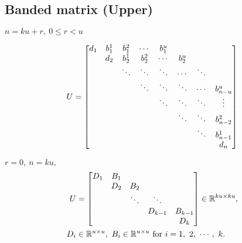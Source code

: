 \documentclass[11pt]{article}
\begin{document}






\newpage
\subsection{Banded matrix (Upper)}

$n = ku + r, \ 0\leq r<u$

\begin{align*}
    U &= \mqty[
        d_{1} & b^{1}_{1} & b^{2}_{1} & \cdots & b^{u}_{1} &   &   &   \\
          & d_{2} & b^{1}_{2} & b^{2}_{2} & \cdots & b^{u}_{2} &   &   \\
          &   & \ddots & \ddots & \ddots & \cdots & \ddots &   \\
          &   &   & \ddots & \ddots & \ddots & \cdots & b^{u}_{n-u} \\
          &   &   &   & \ddots & \ddots & \ddots & \vdots \\
          &   &   &   &   & \ddots & \ddots & b^{2}_{n-2} \\
          &   &   &   &   &   & \ddots & b^{1}_{n-1} \\
          &   &   &   &   &   &   & d_{n} \\
    ]\\
\end{align*}


$r = 0,\ n = ku, $
\begin{align*}
    U &= \mqty[
        D_{1} & B_{1} &   &   &  \\
          & D_{2} & B_{2} &   &  \\
          &   & \ddots & \ddots &  \\
          &   &   & D_{k-1} & B_{k-1}\\
          &   &   &   & D_{k}
    ] \in \mathbb{R}^{ku \times ku},\\
    D_{i} &\in \mathbb{R}^{u \times u}, \ B_{i} \in \mathbb{R}^{u \times u} \ \text{for} \ i = 1,\ 2,\ \cdots,\ k.
\end{align*}
\end{document}

